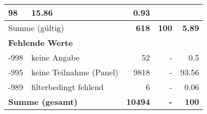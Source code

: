 \begin{longtable}{lXrrr}
       \num{98} &
       \num[round-mode=places,round-precision=2]{15.86} &
         \num[round-mode=places,round-precision=2]{0.93} \\
     \midrule
     \multicolumn{2}{l}{Summe (gültig)} &
       \textbf{\num{618}} &
     \textbf{\num{100}} &
       \textbf{\num[round-mode=places,round-precision=2]{5.89}} \\
     \multicolumn{5}{l}{\textbf{Fehlende Werte}}\\
       -998 &
       keine Angabe &
         \num{52} &
        - &
         \num[round-mode=places,round-precision=2]{0.5} \\
       -995 &
       keine Teilnahme (Panel) &
         \num{9818} &
        - &
         \num[round-mode=places,round-precision=2]{93.56} \\
       -989 &
       filterbedingt fehlend &
         \num{6} &
        - &
         \num[round-mode=places,round-precision=2]{0.06} \\
     \midrule
     \multicolumn{2}{l}{\textbf{Summe (gesamt)}} &
          \textbf{\num{10494}} &
        \textbf{-} &
        \textbf{\num{100}} \\
     \bottomrule
     \end{longtable}
     

